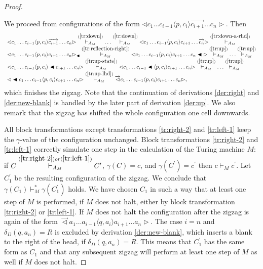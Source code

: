 \documentclass[pre,showpacs,showkeys,preprint]{revtex4}
\theoremstyle{definition}
\begin{document}
\begin{proof}
\begin{enumerate}
We proceed from configurations of the form
$\lhd  c_1 \ldots c_{i-1} \langle p,c_{i} \rangle \overrightarrow{c_{i+1}} \ldots c_n \rhd$. Then
\begin{equation}
\begin{array}{l}
\lhd  c_1 \ldots c_{i-1} \langle p,c_{i} \rangle \overrightarrow{c_{i+1}} \ldots c_n \rhd
\stackrel{(\ref{tr:down})}{\vdash_{A_M}} \ldots \stackrel{(\ref{tr:down})}{\vdash_{A_M}}
\lhd  c_1 \ldots c_{i-1} \langle p,c_{i} \rangle c_{i+1} \ldots \overrightarrow{c_n} \rhd
\stackrel{(\ref{tr:down-a-rhd})}{\vdash_{A_M}} \\
\lhd  c_1 \ldots c_{i-1} \langle p,c_{i} \rangle c_{i+1} \ldots  c_n \rhd_\blacktriangleleft
\stackrel{(\ref{tr:reflection-right})}{\vdash_{A_M}}
\lhd  c_1 \ldots c_{i-1} \langle p,c_{i} \rangle c_{i+1} \ldots  c_n \blacktriangleleft \rhd
\stackrel{(\ref{tr:up})}{\vdash_{A_M}} \ldots \stackrel{(\ref{tr:up})}{\vdash_{A_M}} \\
\lhd  c_1 \ldots c_{i-1} \langle p,c_{i} \rangle \blacktriangleleft c_{i+1} \ldots  c_n  \rhd
\stackrel{(\ref{tr:up-state})}{\vdash_{A_M}}
\lhd  c_1 \ldots c_{i-1} \blacktriangleleft \langle p,c_{i} \rangle  c_{i+1} \ldots  c_n  \rhd
\stackrel{(\ref{tr:up})}{\vdash_{A_M}} \ldots \stackrel{(\ref{tr:up})}{\vdash_{A_M}} \\
\lhd  \blacktriangleleft c_1 \ldots c_{i-1} \langle p,c_{i} \rangle  c_{i+1} \ldots  c_n  \rhd
\stackrel{(\ref{tr:up-lhd})}{\vdash_{A_M}}
\overrightarrow{\lhd}  c_1 \ldots c_{i-1} \langle p,c_{i} \rangle  c_{i+1} \ldots  c_n  \rhd,
\end{array}
\label{der:up}
\end{equation}
which finishes the zigzag.
Note that the continuation of derivations \ref{der:right} and \ref{der:new-blank} is handled by the
later part of derivation \ref{der:up}.
We also remark that the zigzag has shifted the whole configuration one cell downwards.

\end{enumerate}

All block transformations except transformations \ref{tr:right-2} and
\ref{tr:left-1} keep the $\gamma$-value of the configuration unchanged.
Block transformations \ref{tr:right-2} and \ref{tr:left-1} correctly simulate
one step in the calculation of the Turing machine $M$:
if
$C \stackrel{(\ref{tr:right-2}) or (\ref{tr:left-1})}{\vdash_{A_M}} C^\prime$, $\gamma(C)=c$, and $\gamma(C^\prime)=c^\prime$
then $c \vdash_M c^\prime$.
Let $C_1^\prime$ be the resulting configuration of the zigzag.
We conclude that $\gamma(C_1) \vdash_M^* \gamma(C_1^\prime)$ holds.
We have chosen $C_1$ in such a way that at least one step of $M$ is performed, if $M$ does not halt, either by
block transformation \ref{tr:right-2} or \ref{tr:left-1}.
If $M$ does not halt the configuration after the zigzag is again of the form
$\overrightarrow{\lhd}  a_1 \ldots a_{i-1} \langle q,a_i \rangle a_{i+1} \ldots a_n \rhd$.
The case $i = n$ and $\delta_D(q,a_n) = R$ is excluded by derivation \ref{der:new-blank},
which inserts a blank to the right of the head, if $\delta_D(q,a_n) = R$.
This means that $C_1^\prime$ has the same form as $C_1$ and that any subsequent zigzag will  perform at
least one step of $M$ as well if $M$ does not halt.


\end{proof}
\end{document}
